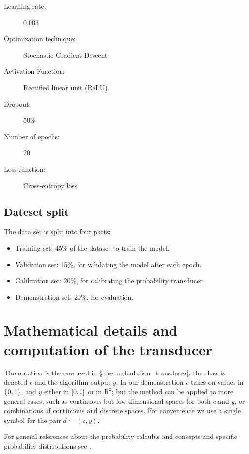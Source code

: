 \documentclass[\ifafour a4paper,12pt,\else a5paper,10pt,\fi%
onecolumn,oneside,article,%
british%
]{memoir}
\theoremstyle{remark}
\theoremstyle{innote}
\newcommand*{\RR}{\bm{\mathrm{R}}}
\newcommand*{\defd}{\coloneqq}
\DeclarePairedDelimiter\clcl{[}{]}
\DeclarePairedDelimiter\set{\{}{\}} %
\renewcommand*{\|}[1][]{\nonscript\:#1\vert\nonscript\:\mathopen{}}
\newcommand*{\sect}{\S}%
\begin{document}
\begin{framed}
  \begin{description}
  \item[Learning rate:] 0.003 
  \item[Optimization technique:] Stochastic Gradient Descent 
  \item[Activation Function:] Rectified linear unit (ReLU) 
  \item[Dropout:] 50\% 
  \item[Number of epochs:] 20 
  \item[Loss function:] Cross-entropy loss
  \end{description}
\end{framed}

\subsection{Dateset split}

The data set is split into four parts:
\begin{itemize}
\item Training set: 45\% of the dataset to train the model.
\item Validation set: 15\%, for validating the model after each epoch.
\item Calibration set: 20\%, for calibrating the probability transducer.
\item Demonstration set: 20\%, for evaluation.
\end{itemize}

\bigskip

\section{Mathematical details and computation of the transducer}
\label{sec:maths_transducer}

The notation is the one used in \sect~\ref{sec:calculation_transducer}: the class is denoted $c$ and the algorithm output $y$. In our demonstration $c$ takes on values in $\set{0,1}$, and $y$ either in $\clcl{0,1}$ or in $\RR^{2}$; but the method can be applied to more general cases, such as continuous but low-dimensional spaces for both $c$ and $y$, or combinations of continuous and discrete spaces. For convenience we use a single symbol for the pair $d \defd (c, y)$.

For general references about the probability calculus and concepts and specific probability distributions see \cites{jaynes1994_r2003,mackay1995_r2005,jeffreys1939_r1983,gregory2005,bernardoetal1994_r2000,hailperin1996,good1950,johnsonetal1969_r1996,johnsonetal1969b_r2005,johnsonetal1970_r1994,johnsonetal1970b_r1995,kotzetal1972_r2000}.
\end{document}
